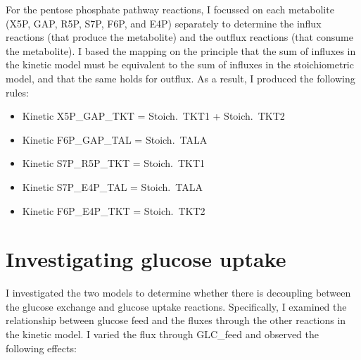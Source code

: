\documentclass[parskip=full, numbers=noenddot]{scrreprt}
\begin{document}
For the pentose phosphate pathway reactions, I focussed on each metabolite (X5P, GAP, R5P, S7P, F6P, and E4P) separately to determine the influx reactions (that produce the metabolite) and the outflux reactions (that consume the metabolite). I based the mapping on the principle that the sum of influxes in the kinetic model must be equivalent to the sum of influxes in the stoichiometric model, and that the same holds for outflux. %
As a result, I produced the following rules:
\begin{itemize}
\item Kinetic X5P\_GAP\_TKT = Stoich.\ TKT1 + Stoich.\ TKT2
\item Kinetic F6P\_GAP\_TAL = Stoich.\ TALA
\item Kinetic S7P\_R5P\_TKT = Stoich.\ TKT1
\item Kinetic S7P\_E4P\_TAL = Stoich.\ TALA
  \item Kinetic F6P\_E4P\_TKT = Stoich.\ TKT2
\end{itemize}


\section{Investigating glucose uptake}
\label{sec:glucoseuptake}



I investigated the two models to determine whether there is decoupling between the glucose exchange and glucose uptake reactions.
Specifically, I examined the relationship between glucose feed and the fluxes through the other reactions in the kinetic model. I varied the flux through GLC\_feed and observed the following effects:

\end{document}
